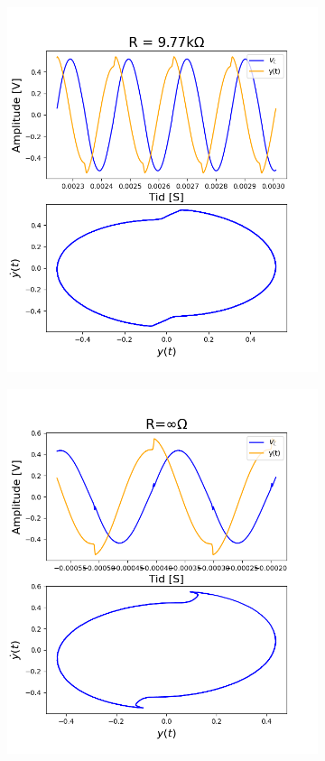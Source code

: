 \documentclass[a4paper,11pt,norsk]{article}
\begin{document}
\begin{figure}
\begin{subfigure}{0.45\linewidth}
    \caption{}
\label{fig:1a}
    \end{subfigure}
    \begin{subfigure}{0.45\linewidth}
\includegraphics[width=\linewidth]{D1/Images/9.png}
    \caption{}
\label{fig:1a}
    \end{subfigure}\hfill
    \begin{subfigure}{0.45\linewidth}
\includegraphics[width=\linewidth]{D1/Images/inf.png}

\end{subfigure}
\end{figure}
\end{document}
